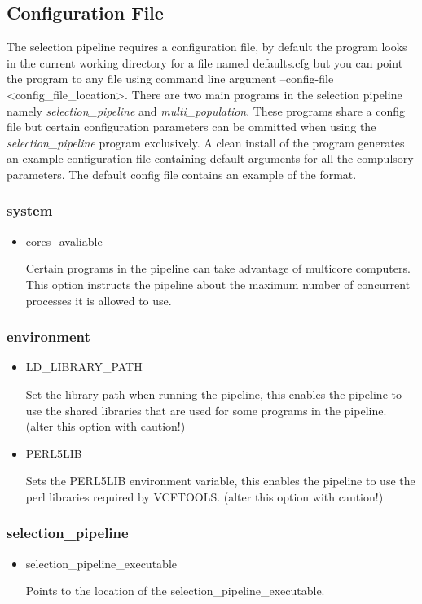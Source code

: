 \subsection{Configuration File}
The selection pipeline requires a configuration file, by default the program looks in the current working directory for a file named defaults.cfg but you can point the program to any file using command line argument --config-file <config\_file\_location>. There are two main programs in the selection pipeline namely \emph{selection\_pipeline} and \emph{multi\_population}. These programs share a config file but certain configuration parameters can be ommitted when using the \emph{selection\_pipeline} program exclusively. A clean install of the program generates an example configuration file containing default arguments for all the compulsory parameters. The default config file contains an example of the format.
\subsubsection{system}
\begin{itemize}
\item cores\_avaliable

Certain programs in the pipeline can take advantage of multicore computers. This option instructs the pipeline about the maximum number of concurrent processes it is allowed to use.
\end{itemize}
\subsubsection{environment}
\begin{itemize}
\item LD\_LIBRARY\_PATH

Set the library path when running the pipeline, this enables the pipeline to use the shared libraries that are used for some programs in the pipeline. (alter this option with caution!)
\item PERL5LIB

Sets the PERL5LIB environment variable, this enables the pipeline to use the perl libraries required by VCFTOOLS. (alter this option with caution!)
\end{itemize}
\subsubsection{selection\_pipeline}
\begin{itemize}
\item selection\_pipeline\_executable

Points to the location of the selection\_pipeline\_executable. 
\end{itemize}
